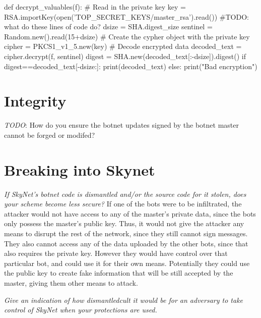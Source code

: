 \documentclass[9pt,a4paper]{article}
\begin{document}
\begin{center}
\vspace{-2ex}
\begin{python}
def decrypt_valuables(f):
    # Read in the private key
    key = RSA.importKey(open('TOP_SECRET_KEYS/master_rsa').read())
    #TODO: what do these lines of code do?
    dsize = SHA.digest_size
    sentinel = Random.new().read(15+dsize)
    # Create the cypher object with the private key
    cipher = PKCS1_v1_5.new(key)
    # Decode encrypted data
    decoded_text = cipher.decrypt(f, sentinel)
    digest = SHA.new(decoded_text[:-dsize]).digest()
    if digest==decoded_text[-dsize:]:
        print(decoded_text)
    else:
        print("Bad encryption")
\end{python}
\end{center}


\section{Integrity}

\emph{TODO}: How do you ensure the botnet updates signed by the botnet master cannot be forged or modifed?

\section{Breaking into Skynet}
\emph{If SkyNet's botnet code is dismantled and/or the source code for it stolen, does your scheme become less secure?}
If one of the bots were to be infiltrated, the attacker would not have access to any of the master's private data, since the bots only possess the master's public key. Thus, it would not give the attacker any means to disrupt the rest of the network, since they still cannot sign messages. They also cannot access any of the data uploaded by the other bots, since that also requires the private key. However they would have control over that particular bot, and could use it for their own means. Potentially they could use the public key to create fake information that will be still accepted by the master, giving them other means to attack. 

\emph{Give an indication of how dismantledcult it would be for an adversary to take control of SkyNet when your protections are used.}
\end{document}
